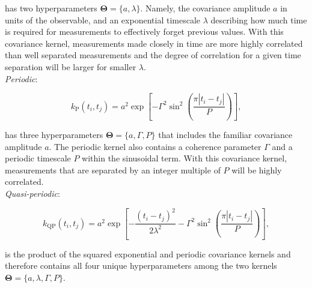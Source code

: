 \noindent has two hyperparameters $\boldsymbol{\Theta}=\{a, \lambda \}$.
Namely, the covariance amplitude $a$ in units of the observable,
and an exponential timescale $\lambda$ describing how much time is required for measurements to
effectively forget previous values. With this covariance kernel, measurements made closely in time
are more highly correlated than well separated measurements and the degree of correlation for a
given time separation will be larger for smaller $\lambda$. \\

\emph{Periodic}:

\begin{equation}
  k_{\text{P}}(t_i,t_j) = a^2 \exp{\left[ -\Gamma^2 \sin^2{\left( \frac{\pi |t_i-t_j|}{P} \right)} \right]},
\end{equation}

\noindent has three hyperparameters  $\boldsymbol{\Theta}=\{a, \Gamma, P \}$
that includes the familiar covariance amplitude $a$. The periodic kernel
also contains a coherence parameter $\Gamma$ and a periodic timescale $P$ within the sinusoidal term.
With this covariance kernel, measurements that are separated by an integer multiple of $P$ will be highly
correlated. \\

\emph{Quasi-periodic}:

\begin{equation}
  k_{\text{QP}}(t_i,t_j) = a^2 \exp{\left[ -\frac{(t_i-t_j)^2}{2\lambda^2} -\Gamma^2
      \sin^2{\left( \frac{\pi |t_i-t_j|}{P} \right)} \right]},
  \label{eq:GpQp}
\end{equation}

\noindent is the product of the squared exponential and periodic covariance kernels and therefore
contains all four unique hyperparameters among the two kernels
$\boldsymbol{\Theta}=\{a, \lambda, \Gamma, P \}$. \\

